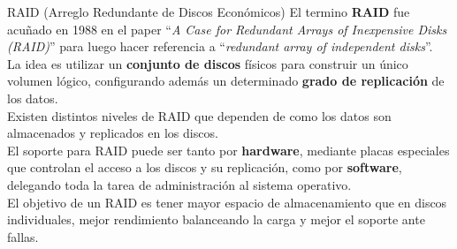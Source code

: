 \documentclass[aspectratio=169]{beamer}
\begin{document}
\begin{frame}{RAID (Arreglo Redundante de Discos Económicos)}
    El termino \textbf{RAID} fue acuñado en 1988 en el paper ``\emph{A Case for Redundant Arrays of Inexpensive Disks (RAID)}'' para luego hacer referencia a ``\emph{redundant array of independent disks}''.\\
    La idea es utilizar un \textcolor{verdeuca}{\textbf{conjunto de discos}} físicos para construir un único volumen lógico, configurando además un determinado \textcolor{verdeuca}{\textbf{grado de replicación}} de los datos.\\
    \bigskip
    \pause
    Existen distintos niveles de RAID que dependen de como los datos son almacenados y replicados en los discos.\\
    \bigskip
    El soporte para RAID puede ser tanto por \textcolor{verdeuca}{\textbf{hardware}}, mediante placas especiales que controlan el acceso a los discos y su replicación, como por \textcolor{verdeuca}{\textbf{software}}, delegando toda la tarea de administración al sistema operativo.\\
    \bigskip
    \pause
    \textcolor{verdeuca}{El objetivo de un RAID es tener mayor espacio de almacenamiento que en discos individuales, mejor rendimiento balanceando la carga y mejor el soporte ante fallas.}
\end{frame}
\end{document}
